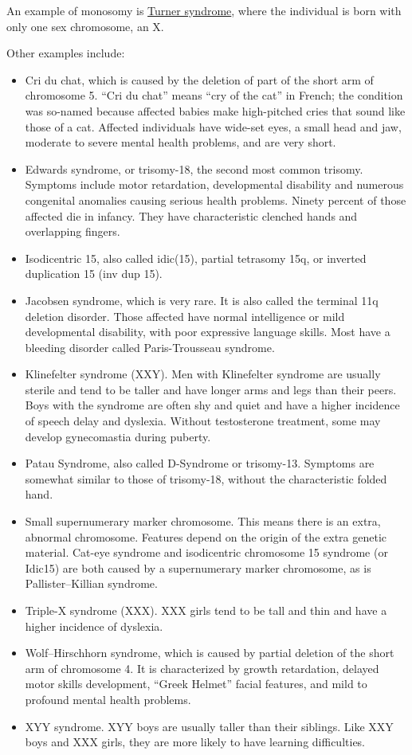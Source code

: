 An example of monosomy is \href{https://en.wikipedia.org/wiki/Turner_syndrome}{Turner syndrome}, where the individual is born with only one sex chromosome, an X.

Other examples include:

\begin{itemize}
\tightlist
\item
  Cri du chat, which is caused by the deletion of part of the short arm of chromosome 5. ``Cri du chat'' means ``cry of the cat'' in French; the condition was so-named because affected babies make high-pitched cries that sound like those of a cat. Affected individuals have wide-set eyes, a small head and jaw, moderate to severe mental health problems, and are very short.
\item
  Edwards syndrome, or trisomy-18, the second most common trisomy. Symptoms include motor retardation, developmental disability and numerous congenital anomalies causing serious health problems. Ninety percent of those affected die in infancy. They have characteristic clenched hands and overlapping fingers.
\item
  Isodicentric 15, also called idic(15), partial tetrasomy 15q, or inverted duplication 15 (inv dup 15).
\item
  Jacobsen syndrome, which is very rare. It is also called the terminal 11q deletion disorder. Those affected have normal intelligence or mild developmental disability, with poor expressive language skills. Most have a bleeding disorder called Paris-Trousseau syndrome.
\item
  Klinefelter syndrome (XXY). Men with Klinefelter syndrome are usually sterile and tend to be taller and have longer arms and legs than their peers. Boys with the syndrome are often shy and quiet and have a higher incidence of speech delay and dyslexia. Without testosterone treatment, some may develop gynecomastia during puberty.
\item
  Patau Syndrome, also called D-Syndrome or trisomy-13. Symptoms are somewhat similar to those of trisomy-18, without the characteristic folded hand.
\item
  Small supernumerary marker chromosome. This means there is an extra, abnormal chromosome. Features depend on the origin of the extra genetic material. Cat-eye syndrome and isodicentric chromosome 15 syndrome (or Idic15) are both caused by a supernumerary marker chromosome, as is Pallister--Killian syndrome.
\item
  Triple-X syndrome (XXX). XXX girls tend to be tall and thin and have a higher incidence of dyslexia.
\item
  Wolf--Hirschhorn syndrome, which is caused by partial deletion of the short arm of chromosome 4. It is characterized by growth retardation, delayed motor skills development, ``Greek Helmet'' facial features, and mild to profound mental health problems.
\item
  XYY syndrome. XYY boys are usually taller than their siblings. Like XXY boys and XXX girls, they are more likely to have learning difficulties.
\end{itemize}

